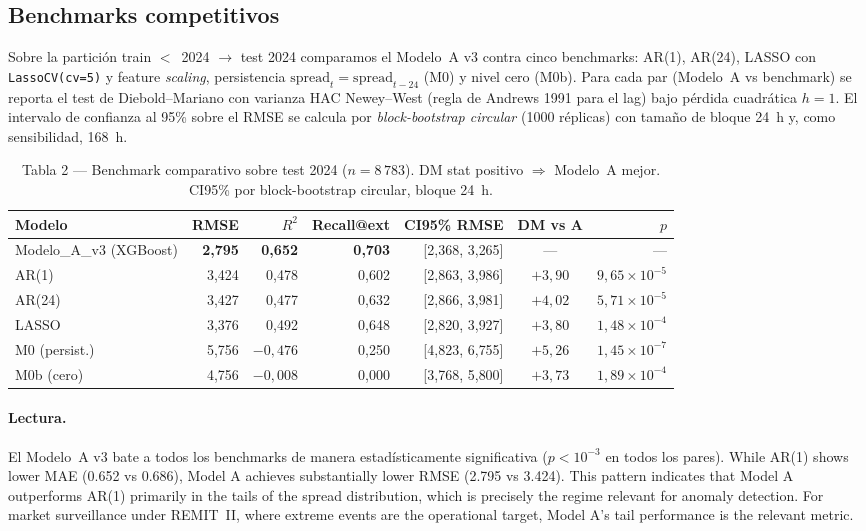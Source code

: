 \documentclass[11pt,a4paper]{article}
\begin{document}
\subsection{Benchmarks competitivos}\label{sec:bench-dm}

Sobre la partición train $<$~2024 $\to$ test 2024 comparamos el
Modelo~A v3 contra cinco benchmarks: AR(1), AR(24), LASSO con
\texttt{LassoCV(cv=5)} y feature \emph{scaling}, persistencia
$\mathrm{spread}_t = \mathrm{spread}_{t-24}$ (M0) y nivel cero (M0b).
Para cada par (Modelo~A vs benchmark) se reporta el test de
Diebold--Mariano \citep{Diebold1995} con varianza HAC Newey--West
(regla de Andrews 1991 para el lag) bajo pérdida cuadrática $h=1$.
El intervalo de confianza al 95\% sobre el RMSE se calcula por
\emph{block-bootstrap circular} (1000 réplicas) con tamaño de bloque
24~h y, como sensibilidad, 168~h.

\begin{table}[H]
\centering
\small
\caption{Tabla 2 — Benchmark comparativo sobre test 2024 ($n = 8\,783$).
DM stat positivo $\Rightarrow$ Modelo~A mejor. CI95\% por block-bootstrap circular,
bloque 24~h.}
\label{tab:t2}
\begin{tabular}{lrrrrcr}
\toprule
\textbf{Modelo} & \textbf{RMSE} & \textbf{$R^2$} & \textbf{Recall@ext} & \textbf{CI95\% RMSE} & \textbf{DM vs A} & \textbf{$p$} \\
\midrule
Modelo\_A\_v3 (XGBoost) & \textbf{2{,}795} & \textbf{0{,}652} & \textbf{0{,}703} & [2{,}368, 3{,}265] & --- & --- \\
AR(1)        & 3{,}424 & 0{,}478 & 0{,}602 & [2{,}863, 3{,}986] & $+3{,}90$ & $9{,}65\times 10^{-5}$ \\
AR(24)       & 3{,}427 & 0{,}477 & 0{,}632 & [2{,}866, 3{,}981] & $+4{,}02$ & $5{,}71\times 10^{-5}$ \\
LASSO        & 3{,}376 & 0{,}492 & 0{,}648 & [2{,}820, 3{,}927] & $+3{,}80$ & $1{,}48\times 10^{-4}$ \\
M0 (persist.) & 5{,}756 & $-0{,}476$ & 0{,}250 & [4{,}823, 6{,}755] & $+5{,}26$ & $1{,}45\times 10^{-7}$ \\
M0b (cero)   & 4{,}756 & $-0{,}008$ & 0{,}000 & [3{,}768, 5{,}800] & $+3{,}73$ & $1{,}89\times 10^{-4}$ \\
\bottomrule
\end{tabular}
\end{table}

\paragraph{Lectura.} El Modelo~A v3 bate a todos los benchmarks de
manera estadísticamente significativa ($p < 10^{-3}$ en todos los
pares). While AR(1) shows lower MAE (0.652 vs 0.686), Model A achieves
substantially lower RMSE (2.795 vs 3.424). This pattern indicates that
Model A outperforms AR(1) primarily in the tails of the spread
distribution, which is precisely the regime relevant for anomaly
detection. For market surveillance under REMIT~II, where extreme events
are the operational target, Model A's tail performance is the relevant
metric.
\end{document}
